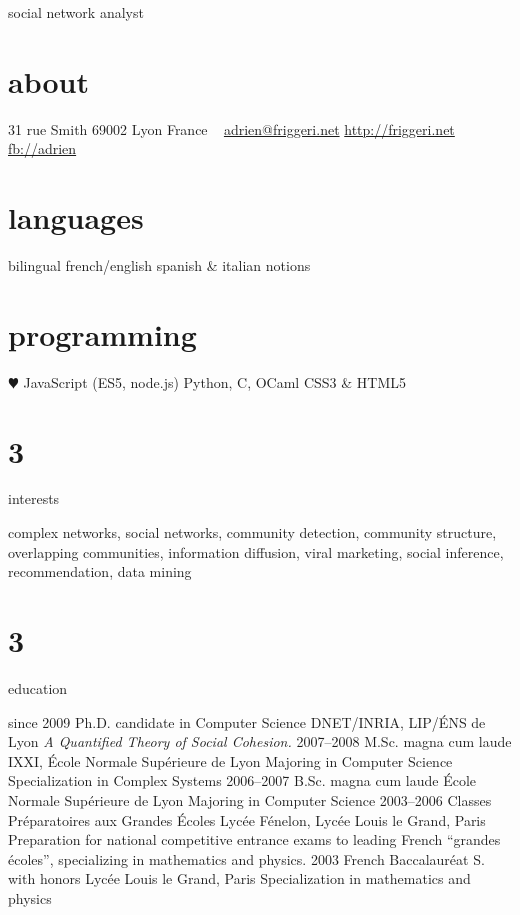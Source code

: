 \documentclass[]{friggeri-cv}
\begin{document}
       {social network analyst}


\begin{aside}
  \section{about}
    31 rue Smith
    69002 Lyon
    France
    ~
    \href{mailto:adrien@friggeri.net}{adrien@friggeri.net}
    \href{http://friggeri.net}{http://friggeri.net}
    \href{http://facebook.com/adrien}{fb://adrien}
  \section{languages}
    bilingual french/english
    spanish \& italian notions
  \section{programming}
    {\color{red} $\varheartsuit$} JavaScript
    (ES5, node.js)
    Python, C, OCaml
    CSS3 \& HTML5
\end{aside}

\section{3}{interests}

complex networks, social networks, community detection, community structure,
overlapping communities, information diffusion, viral marketing, social
inference, recommendation, data mining

\section{3}{education}

\begin{entrylist}
  \entry
    {since 2009}
    {Ph.D. {\normalfont candidate in Computer Science}}
    {DNET/INRIA, LIP/ÉNS de Lyon}
    {\emph{A Quantified Theory of Social Cohesion.}}
  \entry
    {2007–2008}
    {M.Sc. magna cum laude}
    {IXXI, École Normale Supérieure de Lyon}
    {Majoring in Computer Science\\
    Specialization in Complex Systems}
  \entry
    {2006–2007}
    {B.Sc. magna cum laude}
    {École Normale Supérieure de Lyon}
    {Majoring in Computer Science}
  \entry
    {2003–2006}
    {Classes Préparatoires aux Grandes Écoles}
    {Lycée Fénelon, Lycée Louis le Grand, Paris}
    {Preparation for national competitive entrance exams to leading French ``grandes écoles'', specializing in mathematics and physics.}
  \entry
    {2003}
    {French Baccalauréat S. with honors}
    {Lycée Louis le Grand, Paris}
    {Specialization in mathematics and physics}
\end{entrylist}
\end{document}
